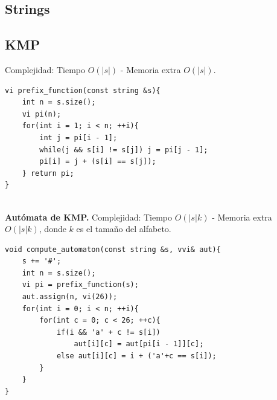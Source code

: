 \documentclass[10pt,spanish,mexico]{article}
\numberwithin{equation}{section}
\begin{document}
\begin{multicols}{2}
\section{Strings}
\subsection{KMP}
Complejidad: Tiempo $O(|s|)$ - Memoria extra $O(|s|)$.
\begin{verbatim}
vi prefix_function(const string &s){
    int n = s.size();
    vi pi(n);
    for(int i = 1; i < n; ++i){
        int j = pi[i - 1];
        while(j && s[i] != s[j]) j = pi[j - 1];
        pi[i] = j + (s[i] == s[j]);
    } return pi;
}
\end{verbatim}

\vspace{-1.2\baselineskip}
\hrulefill\\
\textbf{Autómata de KMP.} Complejidad: Tiempo $O(|s|k)$ - Memoria extra $O(|s|k)$, donde $k$ es el tamaño del alfabeto.
\begin{verbatim}
void compute_automaton(const string &s, vvi& aut){
    s += '#';
    int n = s.size();
    vi pi = prefix_function(s);
    aut.assign(n, vi(26));
    for(int i = 0; i < n; ++i){
        for(int c = 0; c < 26; ++c){
            if(i && 'a' + c != s[i])
                aut[i][c] = aut[pi[i - 1]][c];
            else aut[i][c] = i + ('a'+c == s[i]);
        }
    }
}
\end{verbatim}

\vspace{-1.2\baselineskip}
\hrulefill

\end{multicols}
\end{document}
